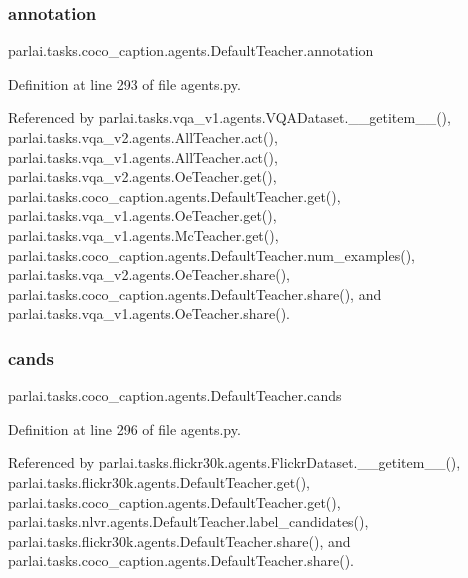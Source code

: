 \subsubsection{\texorpdfstring{annotation}{annotation}}
{\footnotesize\ttfamily parlai.\+tasks.\+coco\+\_\+caption.\+agents.\+Default\+Teacher.\+annotation}



Definition at line 293 of file agents.\+py.



Referenced by parlai.\+tasks.\+vqa\+\_\+v1.\+agents.\+V\+Q\+A\+Dataset.\+\_\+\+\_\+getitem\+\_\+\+\_\+(), parlai.\+tasks.\+vqa\+\_\+v2.\+agents.\+All\+Teacher.\+act(), parlai.\+tasks.\+vqa\+\_\+v1.\+agents.\+All\+Teacher.\+act(), parlai.\+tasks.\+vqa\+\_\+v2.\+agents.\+Oe\+Teacher.\+get(), parlai.\+tasks.\+coco\+\_\+caption.\+agents.\+Default\+Teacher.\+get(), parlai.\+tasks.\+vqa\+\_\+v1.\+agents.\+Oe\+Teacher.\+get(), parlai.\+tasks.\+vqa\+\_\+v1.\+agents.\+Mc\+Teacher.\+get(), parlai.\+tasks.\+coco\+\_\+caption.\+agents.\+Default\+Teacher.\+num\+\_\+examples(), parlai.\+tasks.\+vqa\+\_\+v2.\+agents.\+Oe\+Teacher.\+share(), parlai.\+tasks.\+coco\+\_\+caption.\+agents.\+Default\+Teacher.\+share(), and parlai.\+tasks.\+vqa\+\_\+v1.\+agents.\+Oe\+Teacher.\+share().

\mbox{\label{classparlai_1_1tasks_1_1coco__caption_1_1agents_1_1DefaultTeacher_ab3bd0ce49d1e657108577a9777070459}} 
\subsubsection{\texorpdfstring{cands}{cands}}
{\footnotesize\ttfamily parlai.\+tasks.\+coco\+\_\+caption.\+agents.\+Default\+Teacher.\+cands}



Definition at line 296 of file agents.\+py.



Referenced by parlai.\+tasks.\+flickr30k.\+agents.\+Flickr\+Dataset.\+\_\+\+\_\+getitem\+\_\+\+\_\+(), parlai.\+tasks.\+flickr30k.\+agents.\+Default\+Teacher.\+get(), parlai.\+tasks.\+coco\+\_\+caption.\+agents.\+Default\+Teacher.\+get(), parlai.\+tasks.\+nlvr.\+agents.\+Default\+Teacher.\+label\+\_\+candidates(), parlai.\+tasks.\+flickr30k.\+agents.\+Default\+Teacher.\+share(), and parlai.\+tasks.\+coco\+\_\+caption.\+agents.\+Default\+Teacher.\+share().

